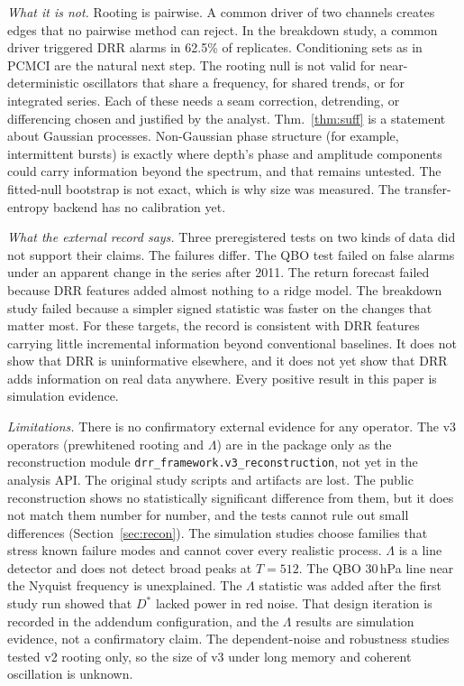 \documentclass[10pt,twocolumn,letterpaper]{article}
\theoremstyle{definition}
\theoremstyle{remark}
\newcommand{\code}[1]{\texttt{#1}}
\begin{document}
\textit{What it is not.} Rooting is pairwise. A common driver of two channels
creates edges that no pairwise method can reject. In the breakdown study, a
common driver triggered DRR alarms in 62.5\% of replicates. Conditioning sets as
in PCMCI \cite{pcmci} are the natural next step. The rooting null is not valid
for near-deterministic oscillators that share a frequency, for shared trends, or
for integrated series. Each of these needs a seam correction, detrending, or
differencing chosen and justified by the analyst. Thm.~\ref{thm:suff} is a
statement about Gaussian processes. Non-Gaussian phase structure (for example,
intermittent bursts) is exactly where depth's phase and amplitude components
could carry information beyond the spectrum, and that remains untested. The
fitted-null bootstrap is not exact, which is why size was measured. The
transfer-entropy backend has no calibration yet.

\textit{What the external record says.} Three preregistered tests on two kinds of
data did not support their claims. The failures differ. The QBO test failed on
false alarms under an apparent change in the series after 2011. The return
forecast failed because DRR features added almost nothing to a ridge model. The
breakdown study failed because a simpler signed statistic was faster on the
changes that matter most. For these targets, the record is consistent with DRR
features carrying little incremental information beyond conventional baselines.
It does not show that DRR is uninformative elsewhere, and it does not yet show
that DRR adds information on real data anywhere. Every positive result in this paper is simulation
evidence.

\textit{Limitations.} There is no confirmatory external evidence for any
operator. The v3 operators (prewhitened rooting and $\Lambda$) are in the
package only as the reconstruction module \code{drr\_framework.v3\_reconstruction},
not yet in the analysis API. The original study scripts and artifacts are lost.
The public reconstruction shows no statistically significant difference from
them, but it does not match them number for number, and the tests cannot rule
out small differences (Section~\ref{sec:recon}). The
simulation studies choose families that stress known failure
modes and cannot cover every realistic process. $\Lambda$ is a line detector and
does not detect broad peaks at $T=512$. The QBO 30\,hPa line near the Nyquist
frequency is unexplained. The $\Lambda$ statistic was added after the first study
run showed that $D^*$ lacked power in red noise. That design iteration is
recorded in the addendum configuration, and the $\Lambda$ results are simulation
evidence, not a confirmatory claim. The dependent-noise and robustness studies
tested v2 rooting only, so the size of v3 under long memory and coherent
oscillation is unknown.
\end{document}
